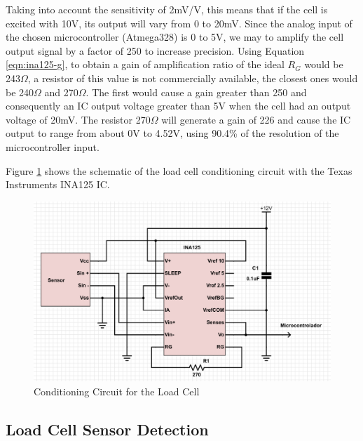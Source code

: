 		Taking into account the sensitivity of 2mV/V, this means that if the cell is excited with 10V, its output will vary from 0 to 20mV. Since the analog input of the chosen microcontroller (Atmega328) is 0 to 5V, we may to amplify the cell output signal by a factor of 250 to increase precision. Using Equation \ref{eqn:ina125-g}, to obtain a gain of amplification ratio of the ideal $R_{G}$ would be 243$\Omega$, a resistor of this value is not commercially available, the closest ones would be 240$\Omega$ and 270$\Omega$. The first would cause a gain greater than 250 and consequently an IC output voltage greater than 5V when the cell had an output voltage of 20mV. The resistor 270$\Omega$ will generate a gain of 226 and cause the IC output to range from about 0V to 4.52V, using 90.4\% of the resolution of the microcontroller input. 
		\par

		Figure \ref{fig:cic-cell} shows the schematic of the load cell conditioning circuit with the Texas Instruments INA125 IC.

		\begin{figure}[htbp]
			\centering
				\includegraphics[scale=0.35]{figuras/fig-cic-cell.png}
			\caption{Conditioning Circuit for the Load Cell}
			\label{fig:cic-cell}
		\end{figure}

\subsection{Load Cell Sensor Detection}
